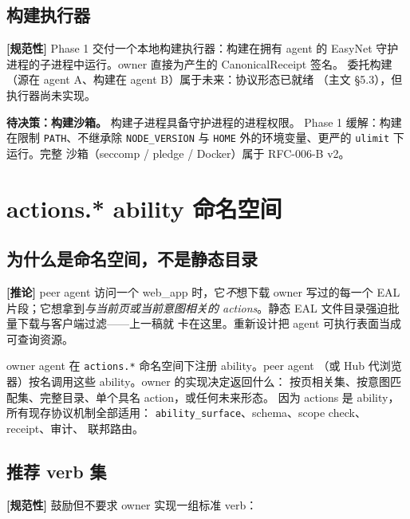 \documentclass[11pt,a4paper]{article}
\newcommand{\normsv}{\textcolor{normativecolor}{\textbf{[规范性]}}\xspace}
\newcommand{\derived}{\textcolor{derivedcolor}{\textbf{[推论]}}\xspace}
\theoremstyle{definition}
\begin{document}
\subsection{构建执行器}

\normsv{} Phase 1 交付一个本地构建执行器：构建在拥有 agent 的 EasyNet
守护进程的子进程中运行。owner 直接为产生的 CanonicalReceipt 签名。
委托构建（源在 agent A、构建在 agent B）属于未来：协议形态已就绪
（主文 \S5.3），但执行器尚未实现。

\begin{decisionbox}
\textbf{待决策：构建沙箱。} 构建子进程具备守护进程的进程权限。
Phase 1 缓解：构建在限制 \texttt{PATH}、不继承除 \texttt{NODE\_VERSION}
与 \texttt{HOME} 外的环境变量、更严的 \texttt{ulimit} 下运行。完整
沙箱（seccomp / pledge / Docker）属于 RFC-006-B v2。
\end{decisionbox}

\section{actions.* ability 命名空间}
\label{sec:actions}

\subsection{为什么是命名空间，不是静态目录}

\derived{} peer agent 访问一个 web\_app 时，它\emph{不}想下载 owner
写过的每一个 EAL 片段；它想拿到\emph{与当前页或当前意图相关的
actions}。静态 EAL 文件目录强迫批量下载与客户端过滤——上一稿就
卡在这里。重新设计把 agent 可执行表面当成可查询资源。

owner agent 在 \texttt{actions.*} 命名空间下注册 ability。peer agent
（或 Hub 代浏览器）按名调用这些 ability。owner 的实现决定返回什么：
按页相关集、按意图匹配集、完整目录、单个具名 action，或任何未来形态。
因为 actions 是 ability，所有现存协议机制全部适用：
\texttt{ability\_surface}、schema、scope check、receipt、审计、
联邦路由。

\subsection{推荐 verb 集}

\normsv{} 鼓励但不要求 owner 实现一组标准 verb：
\end{document}
